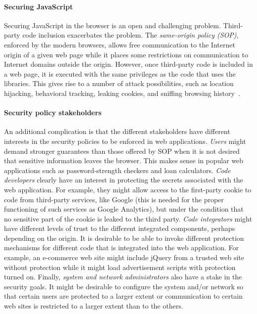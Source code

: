 \documentclass{llncs}
\begin{document}
\paragraph{Securing JavaScript}
Securing JavaScript in the browser is an open and challenging
problem. Third-party code inclusion exacerbates the
problem. The \emph{same-origin policy (SOP)}, enforced by the modern
browsers, allows free communication to the Internet origin of a given web page 
while it
places some restrictions on communication to Internet domains
outside the origin. However, once third-party code is
included in a web page, it is executed with the same privileges as the code
that uses the libraries. This gives rise to a number of attack possibilities,
such as location
hijacking, behavioral tracking, leaking cookies, and sniffing browsing history~\cite{Jang+:CCS10}. 

\paragraph{Security policy stakeholders}
An additional complication is that the different stakeholders have
different interests in the security policies to be enforced
in web applications. 
%
\emph{Users} might demand stronger guarantees than those
offered by SOP when it is not desired that sensitive information leaves
the browser. This makes sense in popular web applications such as
password-strength checkers and loan
calculators.
%
\emph{Code developers} clearly have an interest in protecting the
secrets associated with the web application. For example, they might
allow access to the first-party cookie to code from third-party
services, like Google (this is needed for the proper functioning of
such services
as Google Analytics), but under the condition that no sensitive part
of the cookie is leaked to the third party.
%
\emph{Code integrators} might have different levels of trust to the
different integrated components, perhaps depending on the origin. It
is desirable to be able to invoke different protection mechanisms for 
different code that is integrated into the web application.
For example, an e-commerce web site might include jQuery from a trusted
web site without protection while it might load advertisement scripts
with protection turned on. 
%
Finally, \emph{system and network administrators} also have a
stake in the security goals. It might be desirable to configure the
system and/or network so that certain users are protected to a larger
extent or communication to certain web sites is restricted to a larger
extent than to the others.  
\end{document}
